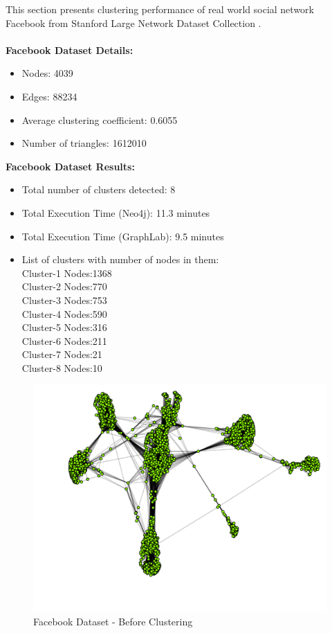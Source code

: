 This section presents clustering performance of real world social network Facebook \cite{facebookdata} from Stanford Large Network Dataset Collection \cite{snap}.\\
\\
\textbf{Facebook Dataset Details:}
\begin{itemize}
	\item
	Nodes: 4039
	\item
	Edges: 88234
	\item
	Average clustering coefficient:	0.6055
	\item
	Number of triangles:	1612010
\end{itemize}
\noindent
\textbf{Facebook Dataset Results:}
\begin{itemize}
	\item
	Total number of clusters detected: 8
	\item
	Total Execution Time (Neo4j): 11.3 minutes
	\item
	Total Execution Time (GraphLab): 9.5 minutes
	\item
	List of clusters with number of nodes in them:\\
	Cluster-1 Nodes:1368\\
	Cluster-2 Nodes:770\\
	Cluster-3 Nodes:753\\
	Cluster-4 Nodes:590\\
	Cluster-5 Nodes:316\\
	Cluster-6 Nodes:211\\
	Cluster-7 Nodes:21\\
	Cluster-8 Nodes:10	
\end{itemize}
\begin{figure}
	\centering
	\includegraphics[scale=0.4, trim=0 0 20 0]{Images/before_facebook.pdf}
	\caption{Facebook Dataset - Before Clustering\label{fig:fb-before}}
\end{figure}
